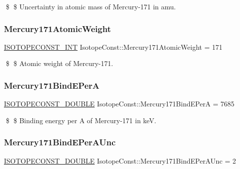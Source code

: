 \$ \$ Uncertainty in atomic mass of Mercury-\/171 in amu. \mbox{\label{group___isotope_const-_mercury-_hg171_ga85bf54d404c2cf19e8b66059b2b72a23}} 
\subsubsection{\texorpdfstring{Mercury171\+Atomic\+Weight}{Mercury171AtomicWeight}}
{\footnotesize\ttfamily \mbox{\hyperlink{group___isotope_const-_macros_ga5f18360b3e99483a35c32d789e62621c}{I\+S\+O\+T\+O\+P\+E\+C\+O\+N\+S\+T\+\_\+\+I\+NT}} Isotope\+Const\+::\+Mercury171\+Atomic\+Weight = 171}

\$ \$ Atomic weight of Mercury-\/171. \mbox{\label{group___isotope_const-_mercury-_hg171_ga26805b83973e1b9b1f0402488544733b}} 
\subsubsection{\texorpdfstring{Mercury171\+Bind\+E\+PerA}{Mercury171BindEPerA}}
{\footnotesize\ttfamily \mbox{\hyperlink{group___isotope_const-_macros_ga8f45a7272ce02c0b4c65c44636ed719a}{I\+S\+O\+T\+O\+P\+E\+C\+O\+N\+S\+T\+\_\+\+D\+O\+U\+B\+LE}} Isotope\+Const\+::\+Mercury171\+Bind\+E\+PerA = 7685}

\$ \$ Binding energy per A of Mercury-\/171 in keV. \mbox{\label{group___isotope_const-_mercury-_hg171_gaf23e2438fbe6ba156dc9df3162bf984a}} 
\subsubsection{\texorpdfstring{Mercury171\+Bind\+E\+Per\+A\+Unc}{Mercury171BindEPerAUnc}}
{\footnotesize\ttfamily \mbox{\hyperlink{group___isotope_const-_macros_ga8f45a7272ce02c0b4c65c44636ed719a}{I\+S\+O\+T\+O\+P\+E\+C\+O\+N\+S\+T\+\_\+\+D\+O\+U\+B\+LE}} Isotope\+Const\+::\+Mercury171\+Bind\+E\+Per\+A\+Unc = 2}

